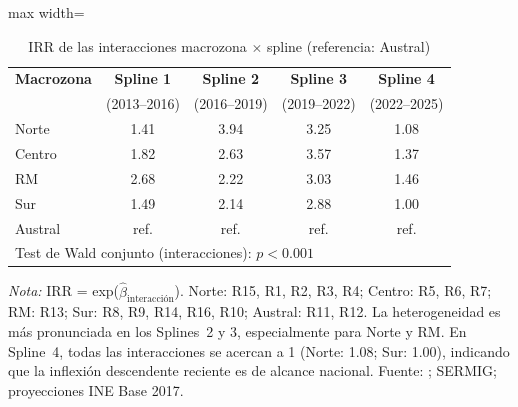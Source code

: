 \documentclass[12pt,a4paper]{article}
\newcommand{\tablenote}[1]{%
  \vspace{2pt}%
  \begin{minipage}{\linewidth}%
    \footnotesize\textit{Nota:} #1%
  \end{minipage}%
}
\begin{document}
\begin{table}[H]
\centering
\caption{IRR de las interacciones macrozona $\times$ spline (referencia: Austral)}
\label{tab:macro}
\small
\begin{adjustbox}{max width=\columnwidth}
\begin{tabular}{lcccc}
\toprule
\textbf{Macrozona} & \textbf{Spline 1} & \textbf{Spline 2} & \textbf{Spline 3} & \textbf{Spline 4} \\
 & (2013--2016) & (2016--2019) & (2019--2022) & (2022--2025) \\
\midrule
Norte   & 1.41 & 3.94 & 3.25 & 1.08 \\
Centro  & 1.82 & 2.63 & 3.57 & 1.37 \\
RM      & 2.68 & 2.22 & 3.03 & 1.46 \\
Sur     & 1.49 & 2.14 & 2.88 & 1.00 \\
Austral & ref. & ref. & ref. & ref. \\
\midrule
\multicolumn{5}{l}{Test de Wald conjunto (interacciones): $p < 0.001$} \\
\bottomrule
\end{tabular}
\end{adjustbox}
\tablenote{IRR = exp($\hat{\beta}_{\text{interacci\'on}}$). Norte: R15, R1, R2, R3, R4;
Centro: R5, R6, R7; RM: R13; Sur: R8, R9, R14, R16, R10; Austral: R11, R12. La
heterogeneidad es m\'as pronunciada en los Splines~2 y 3, especialmente para Norte y
RM. En Spline~4, todas las interacciones se acercan a 1 (Norte: 1.08; Sur: 1.00),
indicando que la inflexi\'on descendente reciente es de alcance nacional. Fuente:
\citet{INE2026}; SERMIG; proyecciones INE Base 2017.}
\end{table}

\end{document}
